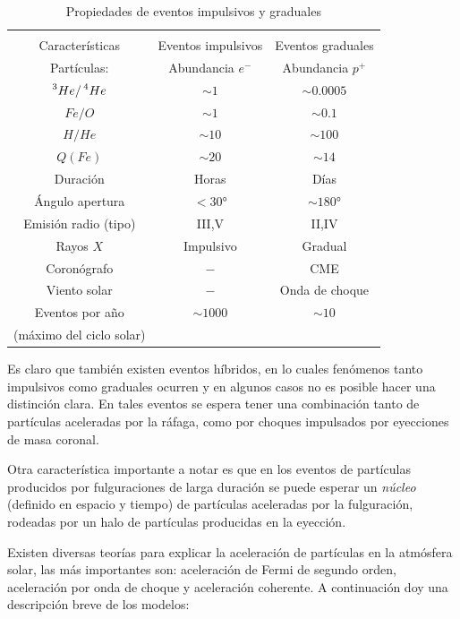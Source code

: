 \begin{table}
\caption{Propiedades de eventos impulsivos y graduales}
\label{table:sep}

\begin{tabular}{ccc}
\toprule
\multicolumn{2}{c}{}\\
\cmidrule(r){1-2}
Características & Eventos impulsivos & Eventos graduales\\
\midrule
Partículas: & Abundancia $e^{-}$ & Abundancia $p^{+}$ \\
$\prescript{3}{}{He}/\prescript{4}{}{He}$ & $\sim 1$ & $\sim 0.0005$\\
$Fe/O$ & $\sim 1$ & $\sim 0.1$\\
$H/He$ &$\sim 10$ & $\sim 100$\\
$Q(Fe)$ & $\sim 20$ & $\sim 14$\\
Duración & Horas & Días\\
Ángulo apertura & $< \ang{30}$ & $\sim \ang{180}$\\
Emisión radio (tipo) & III,V & II,IV\\
Rayos $X$ & Impulsivo & Gradual\\
Coronógrafo & $-$ & CME\\
Viento solar & $-$ & Onda de choque\\
Eventos por año & $\sim 1000$ & $\sim 10$\\
(máximo del ciclo solar) & & \\
\bottomrule

\end{tabular}
\end{table}

Es claro que también existen eventos híbridos, en lo cuales fenómenos tanto impulsivos como graduales ocurren y en algunos casos no es posible hacer una distinción clara. En tales eventos se espera tener una combinación tanto de partículas aceleradas por la ráfaga, como por choques impulsados por eyecciones de masa coronal.

Otra característica importante a notar es que en los eventos de partículas producidos por fulguraciones de larga duración se puede esperar un \emph{núcleo} (definido en espacio y tiempo) de partículas aceleradas por la fulguración, rodeadas por un halo de partículas producidas en la eyección.

Existen diversas teorías para explicar la aceleración de partículas en la atmósfera solar, las más importantes son: aceleración de Fermi de segundo orden, aceleración por onda de choque y aceleración coherente. A continuación doy una descripción breve de los modelos:

